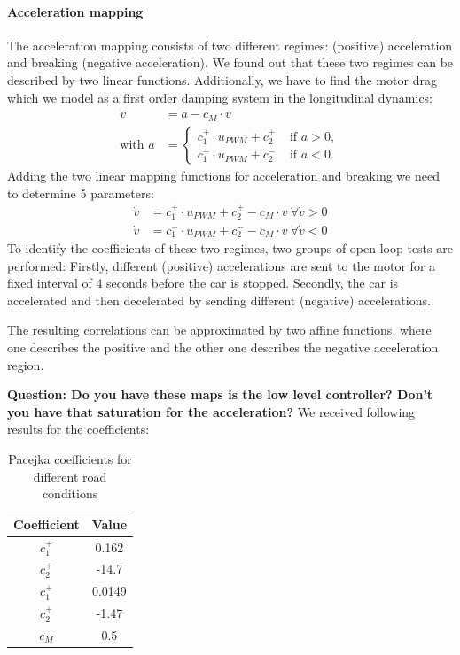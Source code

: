 \paragraph{Acceleration mapping} The acceleration mapping consists of two different regimes: (positive) acceleration and breaking (negative acceleration). We found out that these two regimes can be described by two linear functions. Additionally, we have to find the motor drag which we model as a first order damping system in the longitudinal dynamics:
\begin{align}
\dot v &= a - c_M\cdot v\\
\text{with } a&=\begin{cases}
c_{1}^+\cdot u_{PWM}+c_{2}^+ &\text{ if } a>0,\\
c_{1}^-\cdot u_{PWM}+c_{2}^- &\text{ if } a<0.
\end{cases}
\end{align}
Adding the two linear mapping functions for acceleration and breaking we need to determine 5 parameters:
\begin{align}
\dot v &= c_{1}^+\cdot u_{PWM}+c_{2}^+ - c_M\cdot v\ \forall \dot v > 0\\
\dot v &= c_{1}^-\cdot u_{PWM}+c_{2}^- - c_M\cdot v\ \forall \dot v < 0
\end{align}
To identify the coefficients of these two regimes, two groups of open loop tests are performed: Firstly, different (positive) accelerations are sent to the motor for a fixed interval of 4 seconds before the car is stopped. Secondly, the car is accelerated and then decelerated by sending different (negative) accelerations.

The resulting correlations can be approximated by two affine functions, where one describes the positive and the other one describes the negative acceleration region.


{\bfseries{Question: Do you have these maps is the low level controller? Don't you have that saturation for the acceleration?}}
We received following results for the coefficients:
\begin{table}[h!]
\centering
\begin{tabular}{c|c}
Coefficient & Value\\
\hline
$c_1^+$ & 0.162\\
$c_2^+$ & -14.7\\
$c_1^+$ & 0.0149\\
$c_2^+$ & -1.47\\
$c_M$ & 0.5
\end{tabular}
\caption{Pacejka coefficients for different road conditions}
\label{tab:v_mapping}
\end{table}

